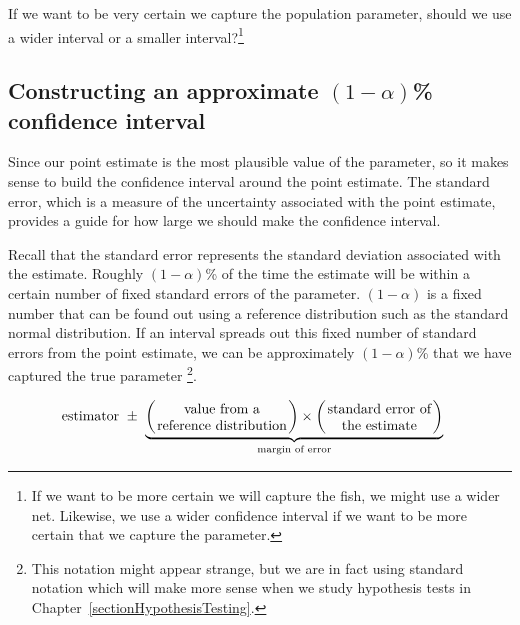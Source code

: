 \begin{exercise}
If we want to be very certain we capture the population parameter, should we use a wider interval or a smaller interval?\footnote{If we want to be more certain we will capture the fish, we might use a wider net. Likewise, we use a wider confidence interval if we want to be more certain that we capture the parameter.}
\end{exercise}

\subsection{Constructing an approximate $(1-\alpha)$\% confidence interval}
\label{sectionConstructingAnApproximateCConfidenceInterval}

Since our point estimate is the most plausible value of the parameter, so it makes sense to build the confidence interval around the point estimate. The standard error, which is a measure of the uncertainty associated with the point estimate, provides a guide for how large we should make the confidence interval.

Recall that the standard error represents the standard deviation associated with the estimate.
Roughly $(1-\alpha)$\% of the time the estimate will be within a certain number of fixed standard errors of the parameter.
$(1-\alpha)$ is a fixed number that can be found out using a reference distribution such as the standard normal distribution.
If an interval spreads out this fixed number of standard errors from the point estimate, we can be 
approximately 
$(1-\alpha)$\%  that we have captured the true parameter
\footnote{This notation might appear strange, but we are in fact using standard notation which will make more sense when we study hypothesis tests in Chapter~\ref{sectionHypothesisTesting}.}.

\begin{termBox}{
\vspace{-3mm}
\begin{align}
\text{estimator}	& ~\pm~ 	\underbrace{
					\bigg( \parbox[c]{3.35cm}{ \centering value from a reference distribution } \bigg)
					\times
					\bigg( \parbox[c]{2.70cm}{ \centering standard error of the estimate } \bigg)
						}_{ \text{margin of error} }\label{tboxSkeletonOfCI}
\end{align}\label{95PercentConfidenceIntervalFormula}
\vspace{-3mm}
}
\end{termBox}

